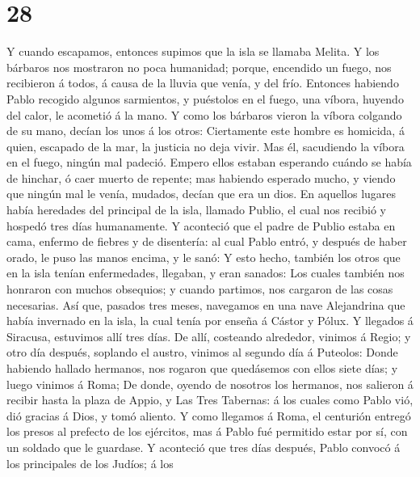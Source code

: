 \hypertarget{section-27}{%
\section{28}\label{section-27}}

 Y cuando escapamos, entonces supimos que la isla se
llamaba Melita.  Y los bárbaros nos mostraron no poca
humanidad; porque, encendido un fuego, nos recibieron á todos, á causa
de la lluvia que venía, y del frío.  Entonces habiendo
Pablo recogido algunos sarmientos, y puéstolos en el fuego, una víbora,
huyendo del calor, le acometió á la mano.  Y como los
bárbaros vieron la víbora colgando de su mano, decían los unos á los
otros: Ciertamente este hombre es homicida, á quien, escapado de la mar,
la justicia no deja vivir.  Mas él, sacudiendo la víbora
en el fuego, ningún mal padeció.  Empero ellos estaban
esperando cuándo se había de hinchar, ó caer muerto de repente; mas
habiendo esperado mucho, y viendo que ningún mal le venía, mudados,
decían que era un dios.  En aquellos lugares había
heredades del principal de la isla, llamado Publio, el cual nos recibió
y hospedó tres días humanamente.  Y aconteció que el padre
de Publio estaba en cama, enfermo de fiebres y de disentería: al cual
Pablo entró, y después de haber orado, le puso las manos encima, y le
sanó:  Y esto hecho, también los otros que en la isla
tenían enfermedades, llegaban, y eran sanados:  Los
cuales también nos honraron con muchos obsequios; y cuando partimos, nos
cargaron de las cosas necesarias.  Así que, pasados tres
meses, navegamos en una nave Alejandrina que había invernado en la isla,
la cual tenía por enseña á Cástor y Pólux.  Y llegados á
Siracusa, estuvimos allí tres días.  De allí, costeando
alrededor, vinimos á Regio; y otro día después, soplando el austro,
vinimos al segundo día á Puteolos:  Donde habiendo
hallado hermanos, nos rogaron que quedásemos con ellos siete días; y
luego vinimos á Roma;  De donde, oyendo de nosotros los
hermanos, nos salieron á recibir hasta la plaza de Appio, y Las Tres
Tabernas: á los cuales como Pablo vió, dió gracias á Dios, y tomó
aliento.  Y como llegamos á Roma, el centurión entregó
los presos al prefecto de los ejércitos, mas á Pablo fué permitido estar
por sí, con un soldado que le guardase.  Y aconteció que
tres días después, Pablo convocó á los principales de los Judíos; á los
